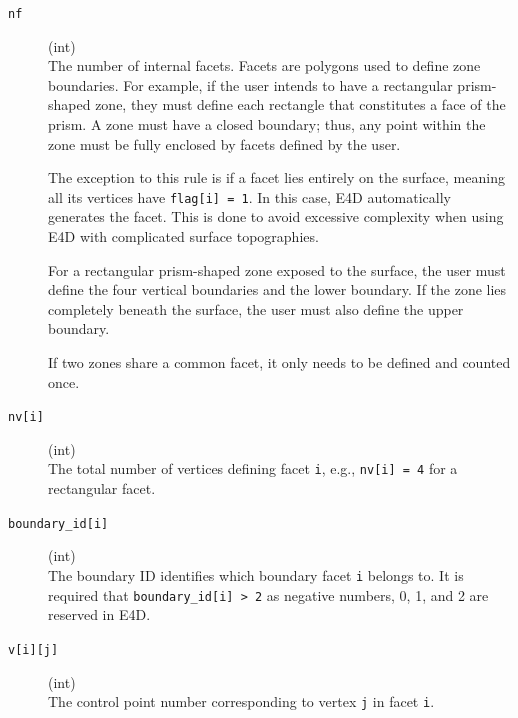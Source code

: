 \documentclass[a4paper,12pt]{article}
\begin{document}
\begin{description}
    \item[\texttt{nf}] (int)\hfill \\
    The number of internal facets. Facets are polygons used to define zone boundaries. For example, if the user intends to have a rectangular prism-shaped zone, they must define each rectangle that constitutes a face of the prism. A zone must have a closed boundary; thus, any point within the zone must be fully enclosed by facets defined by the user.

    The exception to this rule is if a facet lies entirely on the surface, meaning all its vertices have \texttt{flag[i] = 1}. In this case, E4D automatically generates the facet. This is done to avoid excessive complexity when using E4D with complicated surface topographies.

    For a rectangular prism-shaped zone exposed to the surface, the user must define the four vertical boundaries and the lower boundary. If the zone lies completely beneath the surface, the user must also define the upper boundary.
    
    If two zones share a common facet, it only needs to be defined and counted once.

    \item[\texttt{nv[i]}] (int)\hfill \\
    The total number of vertices defining facet \texttt{i}, e.g., \texttt{nv[i] = 4} for a rectangular facet.

    \item[\texttt{boundary\_id[i]}] (int)\hfill \\
    The boundary ID identifies which boundary facet \texttt{i} belongs to. It is required that \texttt{boundary\_id[i] > 2} as negative numbers, 0, 1, and 2 are reserved in E4D.

    \item[\texttt{v[i][j]}] (int)\hfill \\
    The control point number corresponding to vertex \texttt{j} in facet \texttt{i}.


\end{description}
\end{document}
